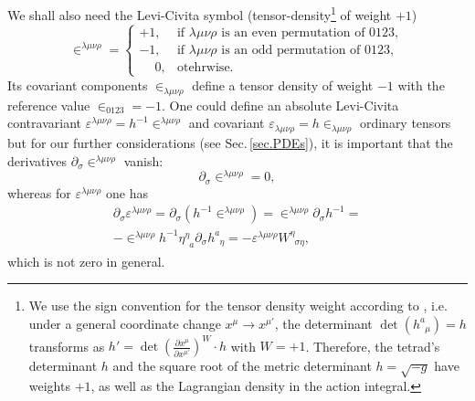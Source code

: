 \documentclass[
10pt, %
a4paper, %
oneside, %
twocolumn,
headinclude,footinclude, %
BCOR5mm, %
]{scrartcl}
\newcommand{\pd}[1]{\partial_{#1}}
\newcommand{\tetrsymbol}{h}
\newcommand{\itetrsymbol}{\eta}
\newcommand{\itetr}[2]{\itetrsymbol^{#1}_{\phantom{#1}#2}}
\newcommand{\tetr}[2]{\tetrsymbol^{#1}_{\phantom{#1}#2}}
\newcommand{\detTetr}{\tetrsymbol}
\newcommand{\D}[1]{\partial_{#1}} %
\newcommand{\w}[2]{W^{#1}_{\phantom{#1}#2}}
\newcommand{\LCsymb}{\bm{\in}}    %
\newcommand{\LCtens}{\varepsilon} %
\begin{document}
	We shall also need the Levi-Civita symbol (tensor-density\footnote{We 
		use the 
		sign convention for the tensor density weight according to \cite{Ryder2009,Grinfeld2013}, 
		i.e.
		under a 
		general 
		coordinate change $ x^\mu \to x^{\mu'} $, the determinant $ \det(\tetr{a}{\mu}) = \detTetr $ 
		transforms as $ \detTetr' = \det \left(\frac{\partial x^\mu}{\partial x^{\mu'}} \right)^W 
		\cdot \detTetr $ with $ W=+1 $. Therefore, the tetrad's determinant $ \detTetr $ and the 
		square root of the metric determinant $ \detTetr = \sqrt{-g} $ have weights $ +1 $, as well 
		as 
		the Lagrangian density in the action integral.} of weight $ +1 $)
	\begin{equation}\label{eqn.LCsymbol.def}
		\LCsymb^{\lambda\mu\nu\rho} = 
		\left\{ 
		\begin{array}{ll}
			+1,	& \text{if \ }\lambda\mu\nu\rho \text{ is an even permutation of } 0123,\\[2mm]
			-1,	& \text{if \ }\lambda\mu\nu\rho \text{ is an odd \ permutation of } 0123,\\[2mm]
			\phantom{-}0,	& \text{otehrwise}.
		\end{array}
		\right.
	\end{equation}
	Its covariant components $ \LCsymb_{\lambda\mu\nu\rho} $ define a tensor density of weight $ -1 
	$ 
	with the reference value $ \LCsymb_{0123} = -1 $. One could define an absolute 
	Levi-Civita 
	contravariant $ \LCtens^{\lambda\mu\nu\rho} = h^{-1} \LCsymb^{\lambda\mu\nu\rho} $ 
	and covariant $ \LCtens_{\lambda\mu\nu\rho} = h \LCsymb_{\lambda\mu\nu\rho} $ ordinary tensors  
	but for our further considerations (see Sec.\,\ref{sec.PDEs}), it is important that 
	the derivatives $ \D{\sigma}\LCsymb^{\lambda\mu\nu\rho} $ vanish:
	\begin{equation}\label{eqn.diff.LCsymb}
		\D{\sigma}\LCsymb^{\lambda\mu\nu\rho} = 0,
	\end{equation}
	whereas for $ \LCtens^{\lambda\mu\nu\rho} $ one has
	\begin{multline}\label{eqn.diff.LeviCivita}
		\D{\sigma}\LCtens^{\lambda\mu\nu\rho} = 
		\pd{\sigma}(\detTetr^{-1}\LCsymb^{\lambda\mu\nu\rho}) = 
		\LCsymb^{\lambda\mu\nu\rho}\pd{\sigma}\detTetr^{-1}   = \\[2mm] 
		-\LCsymb^{\lambda\mu\nu\rho}\detTetr^{-1}\itetr{\eta}{a}\pd{\sigma}\tetr{a}{\eta} = 
		-\LCtens^{\lambda\mu\nu\rho}\w{\eta}{\sigma\eta},
	\end{multline}
	which is not zero in general.
	
	
	
\end{document}
